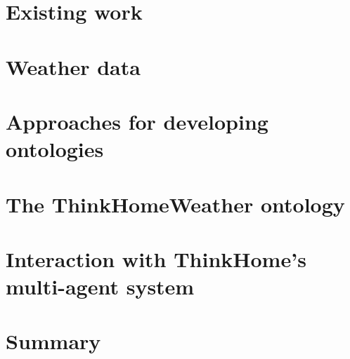 \documentclass[a4paper,11pt,twoside]{memoir}
\begin{document}
\chapter{Existing work}
\label{ch:existing_work}


\chapter{Weather data}
\label{ch:weather_data}


\chapter{Approaches for developing ontologies}
\label{ch:development_approaches}


\chapter{The ThinkHomeWeather ontology}
\label{ch:thinkhomeweather_ontology}


\chapter{Interaction with ThinkHome's multi-agent system}
\label{ch:interaction}


\chapter{Summary}
\label{ch:summary}








\appendix



\end{document}
